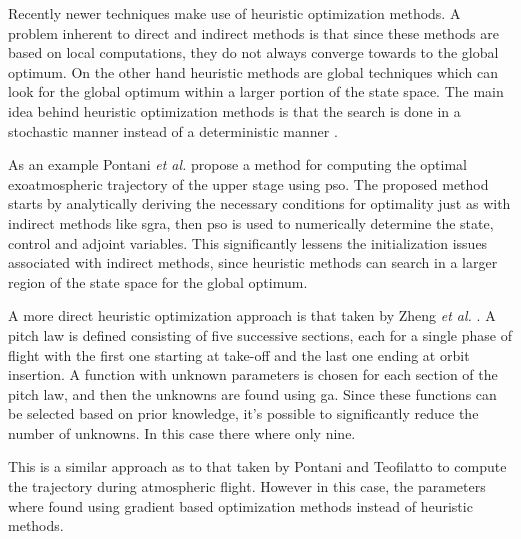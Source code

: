 Recently newer techniques make use of heuristic optimization methods. A problem inherent to direct and indirect methods is that since these methods are based on local computations, they do not always converge towards to the global optimum. On the other hand heuristic methods are global techniques which can look for the global optimum within a larger portion of the state space. The main idea behind heuristic optimization methods is that the search is done in a stochastic manner instead of a deterministic manner \cite{rao2009survey}.

As an example Pontani \emph{et al.} \cite{PONTANI2014852, pontani2013ascent, pontani2014simple} propose a method for computing the optimal exoatmospheric trajectory of the upper stage using \acrfull{pso}. The proposed method starts by analytically deriving the necessary conditions for optimality just as with indirect methods like \acrshort{sgra}, then \acrshort{pso} is used to numerically determine the state, control and adjoint variables. This significantly lessens the initialization issues associated with indirect methods, since heuristic methods can search in a larger region of the state space for the global optimum. 

A more direct heuristic optimization approach is that taken by Zheng \emph{et al.} \cite{zheng2020ascent}. A pitch law is defined consisting of five successive sections, each for a single phase of flight with the first one starting at take-off and the last one ending at orbit insertion. A function with unknown parameters is chosen for each section of the pitch law, and then the unknowns are found using \acrfull{ga}. Since these functions can be selected based on prior knowledge, it's possible to significantly reduce the number of unknowns. In this case there where only nine.

This is a similar approach as to that taken by Pontani and Teofilatto \cite{pontani2014simple} to compute the trajectory during atmospheric flight. However in this case, the parameters where found using gradient based optimization methods instead of heuristic methods.

